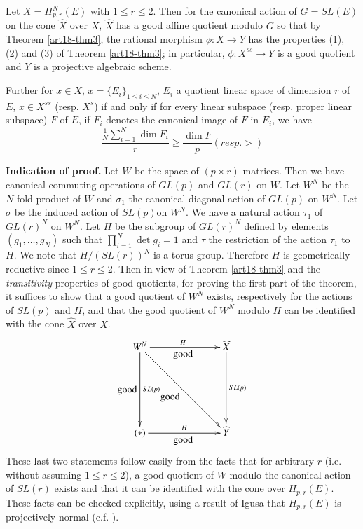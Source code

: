 \begin{theorem}\label{art18-thm4}
Let $X=H^{N}_{p,r}(E)$ with $1\leq r\leq 2$. Then for the canonical action of $G=SL(E)$ on the cone $\widehat{X}$ over $X$, $\widehat{X}$ has a good affine quotient modulo $G$ so that by Theorem \ref{art18-thm3}, the rational morphism $\phi:X\to Y$ has the properties {\rm(1), (2)} and {\rm(3)} of Theorem \ref{art18-thm3}; in particular, $\phi:X^{ss}\to Y$ is a good quotient and $Y$ is a projective algebraic scheme.

Further for $x\in X$, $x=\{E_{i}\}_{1\leq i\leq N}$, $E_{i}$ a quotient linear space of dimension $r$ of $E$, $x\in X^{ss}$ (resp. $X^{s}$) if and only if for every linear subspace (resp. proper linear subspace) $F$ of $E$, if $F_{i}$ denotes the canonical image of $F$ in $E_{i}$, we have
$$
\frac{\frac{1}{N}\sum\limits^{N}_{i=1}\dim F_{i}}{r}\geq \frac{\dim F}{p}(resp. >)
$$
\end{theorem}

\noindent
{\bf Indication of proof.} Let $W$ be the space of $(p\times r)$ matrices. Then we have canonical commuting operations of $GL(p)$ and $GL(r)$ on $W$. Let $W^{N}$ be the $N$-fold product of $W$ and $\sigma_{1}$ the canonical diagonal action of $GL(p)$ on $W^{N}$. Let $\sigma$ be the induced action of $SL(p)$\pageoriginale on $W^{N}$. We have a natural action $\tau_{1}$ of $GL(r)^{N}$ on $W^{N}$. Let $H$ be the subgroup of $GL(r)^{N}$ defined by elements $(g_{1},\ldots,g_{N})$ such that $\prod\limits^{N}_{i=1}\det g_{i}=1$ and $\tau$ the restriction of the action $\tau_{1}$ to $H$. We note that $H/(SL(r))^{N}$ is a torus group. Therefore $H$ is geometrically reductive since $1\leq r\leq 2$. Then in view of Theorem \ref{art18-thm3} and the {\em transitivity} properties of good quotients, for proving the first part of the theorem, it suffices to show that a good quotient of $W^{N}$ exists, respectively for the actions of $SL(p)$ and $H$, and that the good quotient of $W^{N}$ modulo $H$ can be identified with the cone $\widehat{X}$ over $X$.
\[
\xymatrix@=2.5cm{
W^{N}\ar[d]_{\displaystyle\text{good}}^-{SL(p)} \ar[r]^{H}_{\displaystyle\text{good}}\ar[dr]_-{\displaystyle\text{good}} & \widehat{X}\ar[d]^-{SL(p)}\\
(*)\ar[r]^-{H}_{\displaystyle\text{good}} & \widehat{Y}
}
\]
These last two statements follow easily from the facts that for arbitrary $r$ (i.e. without assuming $1\leq r\leq 2$), a good quotient of $W$ modulo the canonical action of $SL(r)$ exists and that it can be identified with the cone over $H_{p,r}(E)$. These facts can be checked explicitly, using a result of Igusa that $H_{p,r}(E)$ is projectively normal (c.f. \cite{art18-key4}).

